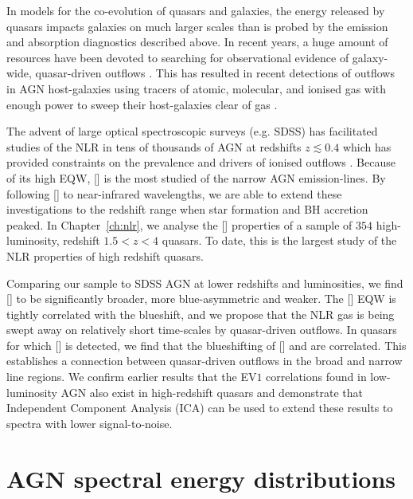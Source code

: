 In models for the co-evolution of quasars and galaxies, the energy released by quasars impacts galaxies on much larger scales than is probed by the emission and absorption diagnostics described above.  
In recent years, a huge amount of resources have been devoted to searching for observational evidence of galaxy-wide, quasar-driven outflows \citep[for recent reviews, see][]{alexander12,fabian12,heckman14}.
This has resulted in recent detections of outflows in AGN host-galaxies using tracers of atomic, molecular, and ionised gas with enough power to sweep their host-galaxies clear of gas \citep[e.g.][]{nesvadba06,arav08,nesvadba08,moe09,dunn10,alexander10,harrison12,harrison14,nesvadba10,rupke13,veilleux13,nardini15,feruglio10,alatalo11,cimatti13,cicone14}.  

The advent of large optical spectroscopic surveys (e.g. SDSS) has facilitated studies of the NLR in tens of thousands of AGN at redshifts $z\lesssim0.4$ which has provided constraints on the prevalence and drivers of ionised outflows \citep[e.g.][]{mullaney13,zakamska14}. 
Because of its high EQW, [] is the most studied of the narrow AGN emission-lines.  
By following [] to near-infrared wavelengths, we are able to extend these investigations to the redshift range when star formation and BH accretion peaked. 
In Chapter~\ref{ch:nlr}, we analyse the [] properties of a sample of $354$ high-luminosity, redshift $1.5 < z < 4$ quasars. 
To date, this is the largest study of the NLR properties of high redshift quasars. 

Comparing our sample to SDSS AGN at lower redshifts and luminosities, we find [] to be significantly broader, more blue-asymmetric and weaker. 
The [] EQW is tightly correlated with the  blueshift, and we propose that the NLR gas is being swept away on relatively short time-scales by quasar-driven outflows.
In quasars for which [] is detected, we find that the blueshifting of [] and  are correlated. 
This establishes a connection between quasar-driven outflows in the broad and narrow line regions.  
We confirm earlier results that the EV$1$ correlations found in low-luminosity AGN also exist in high-redshift quasars and demonstrate that Independent Component Analysis (ICA) can be used to extend these results to spectra with lower signal-to-noise. 

\section{AGN spectral energy distributions}

